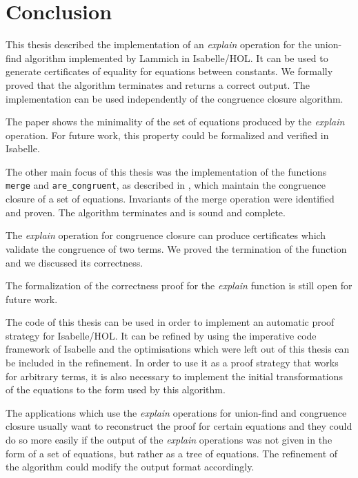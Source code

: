 
\chapter{Conclusion}\label{chapter:conclusion}

This thesis described the implementation of an \emph{explain} operation for the union-find algorithm implemented by Lammich \cite{unionfind-isabelle} in Isabelle/HOL. It can be used to generate certificates of equality for equations between constants. We formally proved that the algorithm terminates and returns a correct output. The implementation can be used independently of the congruence closure algorithm.

The paper \cite{Nieuwenhuis} shows the minimality of the set of equations produced by the \emph{explain} operation. For future work, this property could be formalized and verified in Isabelle.

The other main focus of this thesis was the implementation of the functions \lstinline|merge| and \lstinline|are_congruent|, as described in \cite{Nieuwenhuis}, which maintain the congruence closure of a set of equations. Invariants of the merge operation were identified and proven. The algorithm terminates and is sound and complete.

The \emph{explain} operation for congruence closure can produce certificates which validate the congruence of two terms. We proved the termination of the function and we discussed its correctness.

The formalization of the correctness proof for the \emph{explain} function is still open for future work.

The code of this thesis can be used in order to implement an automatic proof strategy for Isabelle/HOL. It can be refined by using the imperative code framework of Isabelle \cite{imperativehol} and the optimisations which were left out of this thesis can be included in the refinement. In order to use it as a proof strategy that works for arbitrary terms, it is also necessary to implement the initial transformations of the equations to the form used by this algorithm.

The applications which use the \emph{explain} operations for union-find and congruence closure usually want to reconstruct the proof for certain equations and they could do so more easily if the output of the \emph{explain} operations was not given in the form of a set of equations, but rather as a tree of equations. The refinement of the algorithm could modify the output format accordingly.
